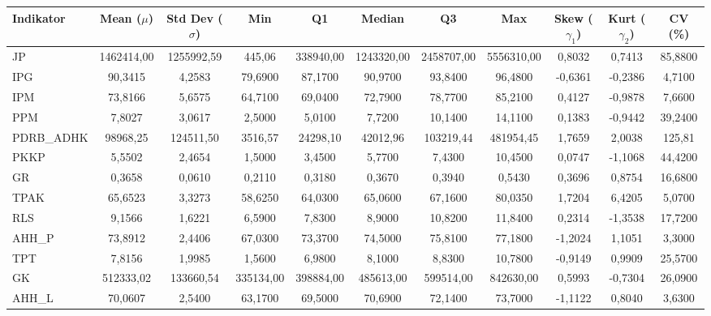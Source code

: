 \begin{adjustbox}{max width=\textwidth}
\small
\begin{tabular}{|>{\centering\arraybackslash}p{2.5cm}|c|c|c|c|c|c|c|c|c|c|}
\hline
\textbf{Indikator} & \textbf{Mean ($\mu$)} & \textbf{Std Dev ($\sigma$)} & \textbf{Min} & \textbf{Q1} & \textbf{Median} & \textbf{Q3} & \textbf{Max} & \textbf{Skew ($\gamma_1$)} & \textbf{Kurt ($\gamma_2$)} & \textbf{CV (\%)} \\
\hline
JP & 1462414,00 & 1255992,59 & 445,06 & 338940,00 & 1243320,00 & 2458707,00 & 5556310,00 & 0,8032 & 0,7413 & 85,8800 \\
IPG & 90,3415 & 4,2583 & 79,6900 & 87,1700 & 90,9700 & 93,8400 & 96,4800 & -0,6361 & -0,2386 & 4,7100 \\
IPM & 73,8166 & 5,6575 & 64,7100 & 69,0400 & 72,7900 & 78,7700 & 85,2100 & 0,4127 & -0,9878 & 7,6600 \\
PPM & 7,8027 & 3,0617 & 2,5000 & 5,0100 & 7,7200 & 10,1400 & 14,1100 & 0,1383 & -0,9442 & 39,2400 \\
PDRB\_ADHK & 98968,25 & 124511,50 & 3516,57 & 24298,10 & 42012,96 & 103219,44 & 481954,45 & 1,7659 & 2,0038 & 125,81 \\
PKKP & 5,5502 & 2,4654 & 1,5000 & 3,4500 & 5,7700 & 7,4300 & 10,4500 & 0,0747 & -1,1068 & 44,4200 \\
GR & 0,3658 & 0,0610 & 0,2110 & 0,3180 & 0,3670 & 0,3940 & 0,5430 & 0,3696 & 0,8754 & 16,6800 \\
TPAK & 65,6523 & 3,3273 & 58,6250 & 64,0300 & 65,0600 & 67,1600 & 80,0350 & 1,7204 & 6,4205 & 5,0700 \\
RLS & 9,1566 & 1,6221 & 6,5900 & 7,8300 & 8,9000 & 10,8200 & 11,8400 & 0,2314 & -1,3538 & 17,7200 \\
AHH\_P & 73,8912 & 2,4406 & 67,0300 & 73,3700 & 74,5000 & 75,8100 & 77,1800 & -1,2024 & 1,1051 & 3,3000 \\
TPT & 7,8156 & 1,9985 & 1,5600 & 6,9800 & 8,1000 & 8,8300 & 10,7800 & -0,9149 & 0,9909 & 25,5700 \\
GK & 512333,02 & 133660,54 & 335134,00 & 398884,00 & 485613,00 & 599514,00 & 842630,00 & 0,5993 & -0,7304 & 26,0900 \\
AHH\_L & 70,0607 & 2,5400 & 63,1700 & 69,5000 & 70,6900 & 72,1400 & 73,7000 & -1,1122 & 0,8040 & 3,6300 \\
\hline
\end{tabular}
\end{adjustbox}
